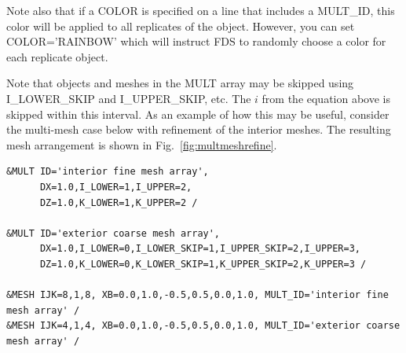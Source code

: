 \documentclass[11pt]{book}
\begin{document}
Note also that if a {\ct COLOR} is specified on a line that includes a {\ct MULT\_ID}, this color will be applied to all replicates of the object. However, you can set {\ct COLOR='RAINBOW'} which will instruct FDS to randomly choose a color for each replicate object.

Note that objects and meshes in the {\ct MULT} array may be skipped using {\ct I\_LOWER\_SKIP} and {\ct I\_UPPER\_SKIP}, etc.  The $i$ from the equation above is skipped within this interval.  As an example of how this may be useful, consider the multi-mesh case below with refinement of the interior meshes.  The resulting mesh arrangement is shown in Fig.~\ref{fig:multmeshrefine}.

\begin{lstlisting}
&MULT ID='interior fine mesh array',
      DX=1.0,I_LOWER=1,I_UPPER=2,
      DZ=1.0,K_LOWER=1,K_UPPER=2 /

&MULT ID='exterior coarse mesh array',
      DX=1.0,I_LOWER=0,I_LOWER_SKIP=1,I_UPPER_SKIP=2,I_UPPER=3,
      DZ=1.0,K_LOWER=0,K_LOWER_SKIP=1,K_UPPER_SKIP=2,K_UPPER=3 /

&MESH IJK=8,1,8, XB=0.0,1.0,-0.5,0.5,0.0,1.0, MULT_ID='interior fine mesh array' /
&MESH IJK=4,1,4, XB=0.0,1.0,-0.5,0.5,0.0,1.0, MULT_ID='exterior coarse mesh array' /
\end{lstlisting}

\baselineskip
\end{document}

